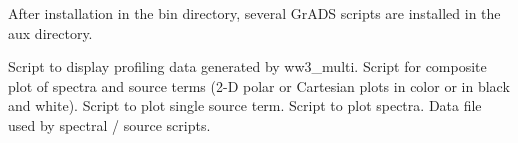 After installation in the {\dir bin} directory, several GrADS scripts are
installed in the {\dir aux} directory.

\begin{flist}
      {Script to display profiling data generated by {\file
                       ww3\_multi}.} 
       {Script for composite plot of spectra and source
                       terms (2-D polar or Cartesian plots in color or in
                       black and white).}
      {Script to plot single source term.}
         {Script to plot spectra.}
   {Data file used by spectral / source scripts.}
\end{flist}



\pb

